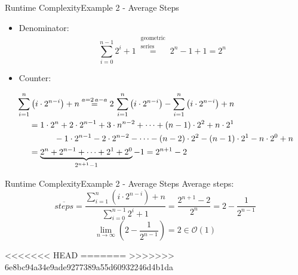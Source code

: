 \begin{frame}{Runtime Complexity}{Example 2 - Average Steps}
  \begin{itemize}
    \item
      Denominator:
      \begin{displaymath}
        \sum_{i=0}^{n-1} 2^i + 1
        \stackrel{\begin{array}{c}
          \text{geometric}\\
          \text{series}
        \end{array}}{=}
        2^n - 1 + 1 = 2^n
      \end{displaymath}
    \item
      Counter:
  \end{itemize}
  \begin{alignat*}{4}
    & \sum_{i=1}^n \left(i \cdot 2^{n-i}\right) + n
      \stackrel{a = 2\,a - a}{=}
        2 \, \sum_{i=1}^n \left(i \cdot 2^{n-i}\right)
        - \sum_{i=1}^n \left(i \cdot 2^{n-i}\right) + n\\
    & \hspace*{1.5em} = 1 \cdot 2^n + 2 \cdot 2^{n-1} + 3 \cdot n^{n-2} + \dots
        + (n-1) \cdot 2^2 + n \cdot 2^1\\
    & \hspace{4.5em}- 1 \cdot 2^{n-1} - 2 \cdot 2^{n-2} - \dots
        - (n-2) \cdot 2^2 - (n-1) \cdot 2^1 - n \cdot 2^0 + n\\
    & \hspace*{1.5em} = \underbrace{2^n + 2^{n-1} + \dots
        +2^1 + 2^0}_{2^{n+1}-1} - 1
      = 2^{n+1} - 2
  \end{alignat*}
\end{frame}


\begin{frame}{Runtime Complexity}{Example 2 - Average Steps}
  {\color{Mittel-Blau}Average steps}:
  \begin{displaymath}
    \overline{steps}
    = \frac{
      \sum\limits_{i=1}^n \left(i \cdot 2^{n-i}\right) + n
    }{\sum\limits_{i=0}^{n-1} 2^i + 1}
    = \frac{2^{n+1} - 2}{2^n}
    = 2 - \frac{1}{2^{n-1}}
  \end{displaymath}
  \begin{displaymath}
    \lim_{n \to \infty} \left(2 - \frac{1}{2^{n-1}}\right) = 2
    \in \mathcal{O}(1)
  \end{displaymath}
\end{frame}
<<<<<<< HEAD
=======
>>>>>>> 6e8bc94a34e9ade9277389a55d60932246d4b1da
